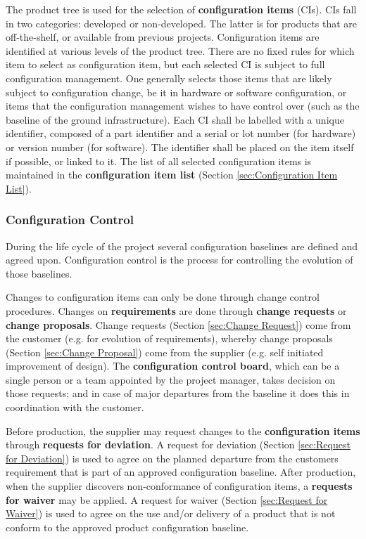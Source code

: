 The product tree is used for the selection of \textbf{configuration items} (CIs). CIs fall in two categories: developed or non-developed. The latter is for products that are off-the-shelf, or available from previous projects. Configuration items are identified at various levels of the product tree. There are no fixed rules for which item to select as configuration item, but each selected CI is subject to full configuration management. One generally selects those items that are likely subject to configuration change, be it in hardware or software configuration, or items that the configuration management wishes to have control over (such as the baseline of the ground infrastructure). Each CI shall be labelled with a unique identifier, composed of a part identifier and a serial or lot number (for hardware) or version number (for software). The identifier shall be placed on the item itself if possible, or linked to it. The list of all selected configuration items is maintained in the \textbf{configuration item list} (Section \ref{sec:Configuration Item List}).

\subsubsection{Configuration Control}

During the life cycle of the project several configuration baselines are defined and agreed upon. Configuration control is the process for controlling the evolution of those baselines.

Changes to configuration items can only be done through change control procedures. Changes on \textbf{requirements} are done through \textbf{change requests} or \textbf{change proposals}. Change requests (Section \ref{sec:Change Request}) come from the customer (e.g. for evolution of requirements), whereby change proposals (Section \ref{sec:Change Proposal}) come from the supplier (e.g. self initiated improvement of design). The \textbf{configuration control board}, which can be a single person or a team appointed by the project manager, takes decision on those requests; and in case of major departures from the baseline it does this in coordination with the customer.

Before production, the supplier may request changes to the \textbf{configuration items} through \textbf{requests for deviation}. A request for deviation (Section \ref{sec:Request for Deviation}) is used to agree on the planned departure from the customers requirement that is part of an approved configuration baseline. After production, when the supplier discovers non-conformance of configuration items, a \textbf{requests for waiver} may be applied.  A request for waiver (Section \ref{sec:Request for Waiver}) is used to agree on the use and/or delivery of a product that is not conform to the approved product configuration baseline.

